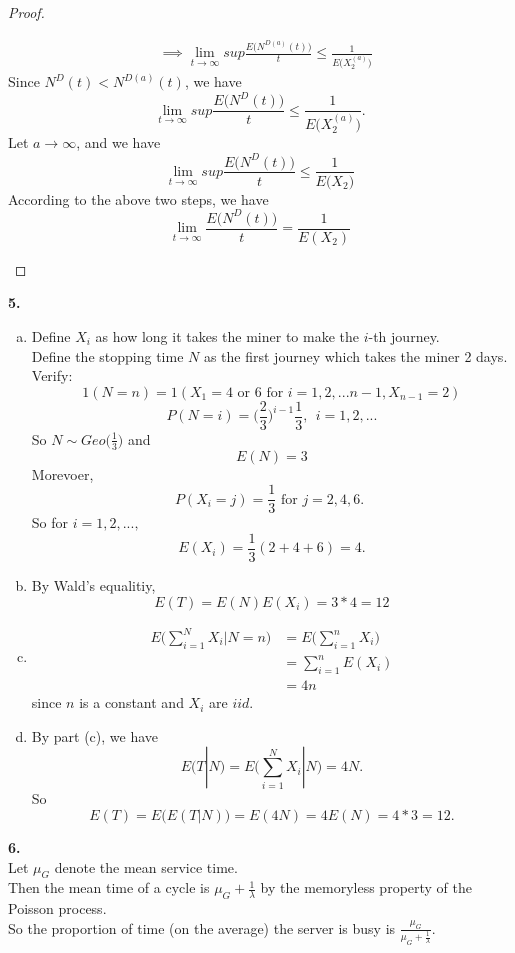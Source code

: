 \documentclass{amsart}
\theoremstyle{plain}
\theoremstyle{definition}
\begin{document}
\begin{proof}
\begin{enumerate}[(a)]
\begin{align*}
		& \implies \lim_{t\to \infty}sup \frac{E\big(N^{D(a)}(t)\big)}{t} \leq \frac{1}{E\big(X_2^{(a)}\big)}
	\end{align*}
	Since $N^D(t) < N^{D(a)}(t)$, we have 
	\[	\lim_{t\to \infty}sup \frac{E\big(N^D(t)\big)}{t} \leq \frac{1}{E\big(X_2^{(a)}\big)}. \]
	Let $a\to \infty$, and we have \\
	\[	\lim_{t\to \infty}sup \frac{E\big(N^D(t)\big)}{t} \leq \frac{1}{E\big(X_2\big)} \]
	According to the above two steps, we have
	\[	\lim_{t \to \infty} \frac{E\big(N^D(t) \big)}{t}  = \frac{1}{E(X_2)}\]
\end{enumerate}
\end{proof}
 
\vspace{5mm}

\noindent \textbf{5.} 
\begin{enumerate}[(a)]
	\item
		Define $X_i$ as how long it takes the miner to make the $i$-th journey. \\
		Define the stopping time $N$ as the first journey which takes the miner 2 days.\\ 
		Verify: 
		\[1(N=n) = 1(X_1 = 4\text{ or }6 \text{ for } i = 1,2,...n-1, X_{n-1} = 2)	\]		 
		\[P(N=i) = \Big({\frac{2}{3}}\Big)^{i-1}\frac{1}{3},\ \ i = 1,2,...\]
		So $N\sim Geo\Big(\frac{1}{3}\Big)$ and  
		\[E(N) = 3\]
		Morevoer,
		\[ P(X_i = j) = \frac{1}{3}\text{ for $j=2,4,6$. } \]
		So for $i=1,2,...,$
		\[E(X_i) = \frac{1}{3}(2+4+6) = 4.\]
	\item
		By Wald's equalitiy,
		\[ E(T)  = E(N)E(X_i) = 3*4 = 12\]
	\item
		\begin{align*}
			E\Bigg(\sum_{i=1}^NX_i|N=n\Bigg) &= E\Bigg(\sum_{i=1}^nX_i\Bigg )\\
											 &=\sum_{i=1}^nE(X_i)\\
											 &=4n
		\end{align*}
		since $n$ is a constant and $X_i$ are $iid$.\\
	\item
		By part (c), we have 
		\[E(T|N) = E\Bigg(\sum_{i=1}^NX_i|N\Bigg) =4N.\]
		So
		\[ E(T)= E\big(E(T|N)\big) = E(4N) = 4E(N) = 4*3 = 12. \]
\end{enumerate}

\vspace{5mm}

\noindent \textbf{6.} \\
Let $\mu_G$ denote the mean service time.\\
Then the mean time of a cycle is $\mu_G + \frac{1}{\lambda}$ by the memoryless property of the Poisson process.\\
So the proportion of time (on the average) the server is busy is $\frac{\mu_G}{\mu_G + \frac{1}{\lambda}}$.
\end{document}
